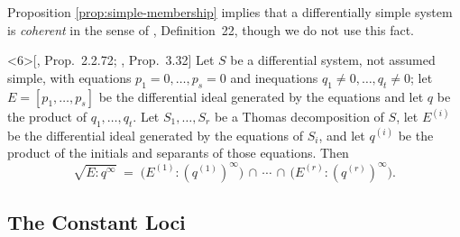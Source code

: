 \documentclass{article}
\theoremstyle{definition}
\theoremstyle{plain}
\newcommand{\condref}[1]{\hyperlink{cond:#1}{(#1)}}
\begin{document}
\smallskip
Proposition \ref{prop:simple-membership} implies that a differentially
simple system is {\it coherent} in the sense of \cite{blop}, Definition~22,
though we do not use this fact.

\begin{proposition}<6>[\cite{RobertzLNM}, Prop.~2.2.72; \cite{RobertzCIRM}, Prop.~3.32]
\label{prop:decomposition-membership}
Let $S$ be a differential system, not assumed simple, with equations
$p_1 = 0, \ldots, p_s = 0$ and inequations $q_1 \ne 0, \ldots, q_t \ne 0$; let
$E = [p_1, \ldots, p_s]$ be the differential ideal generated by the equations
and let $q$ be the product of $q_1, \ldots, q_t$.  Let $S_1, \ldots, S_r$ be a
Thomas decomposition of $S$, let $E^{(i)}$ be the differential ideal generated
by the equations of $S_i$, and let $q^{(i)}$ be the product of the initials and
separants of those equations.  Then
%
\[
\sqrt{E : q^\infty}
  \;=\; \bigl(E^{(1)} : (q^{(1)})^\infty\bigr)
        \,\cap\,\cdots\,\cap\,
        \bigl(E^{(r)} : (q^{(r)})^\infty\bigr).
\]
\end{proposition}

\subsection{The Constant Loci}
\label{sec:constant-loci}
\end{document}

